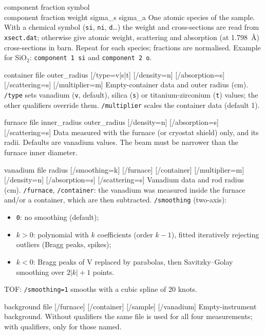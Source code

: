 \documentclass[11pt,a4paper]{report}
\newcommand{\code}[1]{\texttt{#1}}
\newcommand{\file}[1]{\texttt{#1}}
\begin{document}
\begin{cmdbox}{component  fraction  symbol\\ component  fraction  weight  sigma\_s  sigma\_a}
One atomic species of the sample. With a chemical symbol (\code{si}, \code{ni},
\code{d}\dots) the weight and cross-sections are read from \file{xsect.dat};
otherwise give atomic weight, scattering and absorption (at 1.798~\AA)
cross-sections in barn. Repeat for each species; fractions are normalised.
Example for SiO$_2$: \code{component 1 si} and \code{component 2 o}.
\end{cmdbox}

\begin{cmdbox}{container  file  outer\_radius  [/type=v|s|t] [/density=n] [/absorption=s] [/scattering=s] [/multiplier=m]}
Empty-container data and outer radius (cm). \code{/type} sets vanadium
(\code{v}, default), silica (\code{s}) or titanium-zirconium (\code{t})
values; the other qualifiers override them. \code{/multiplier} scales the
container data (default 1).
\end{cmdbox}

\begin{cmdbox}{furnace  file  inner\_radius  outer\_radius  [/density=n] [/absorption=s] [/scattering=s]}
Data measured with the furnace (or cryostat shield) only, and its radii.
Defaults are vanadium values. The beam must be narrower than the furnace inner
diameter.
\end{cmdbox}

\begin{cmdbox}{vanadium  file  radius  [/smoothing=k] [/furnace] [/container] [/multiplier=m] [/density=n] [/absorption=s] [/scattering=s]}
Vanadium data and rod radius (cm). \code{/furnace}, \code{/container}: the
vanadium was measured inside the furnace and/or a container, which are then
subtracted. \code{/smoothing} (two-axis):
\begin{itemize}
  \item \code{0}: no smoothing (default);
  \item $k>0$: polynomial with $k$ coefficients (order $k-1$), fitted iteratively
        rejecting outliers (Bragg peaks, spikes);
  \item $k<0$: Bragg peaks of V replaced by parabolas, then Savitzky--Golay
        smoothing over $2|k|+1$ points.
\end{itemize}
TOF: \code{/smoothing=1} smooths with a cubic spline of 20 knots.
\end{cmdbox}

\begin{cmdbox}{background  file  [/furnace] [/container] [/sample] [/vanadium]}
Empty-instrument background. Without qualifiers the same file is used for all
four measurements; with qualifiers, only for those named.
\end{cmdbox}
\end{document}

